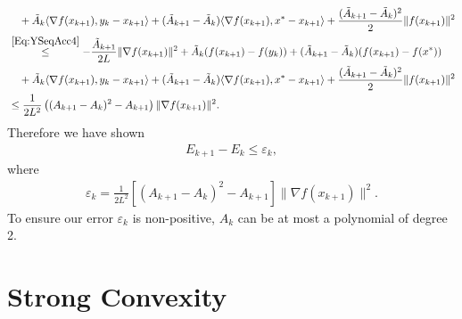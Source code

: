 \documentclass[11pt]{article}
\theoremstyle{plain}
\begin{document}
\begin{align*}
&\quad  + \tilde A_{k} \langle \nabla f(x_{k+1}),  y_k - x_{k+1}\rangle + (\tilde A_{k+1} - \tilde A_k)\langle \nabla f(x_{k+1}), x^\ast - x_{k+1}\rangle + \frac{(\tilde A_{k+1} - \tilde A_k)^2}{2}\|f(x_{k+1})\|^2 \\
& \overset{\eqref{Eq:YSeqAcc4}}{\leq} - \frac{\tilde A_{k+1}}{2L}\|\nabla f(x_{k+1})\|^2 + \tilde A_{k}(f(x_{k+1}) - f(y_{k})) + (\tilde A_{k+1} - \tilde A_k)(f(x_{k+1}) - f(x^\ast)) \\
&\quad  + \tilde A_{k} \langle \nabla f(x_{k+1}),  y_k - x_{k+1}\rangle + (\tilde A_{k+1} - \tilde A_k)\langle \nabla f(x_{k+1}), x^\ast - x_{k+1}\rangle + \frac{(\tilde A_{k+1} - \tilde A_k)^2}{2}\|f(x_{k+1})\|^2 \\
& \leq \frac{1}{2L^2}\left((A_{k+1} -  A_k)^2 - A_{k+1} \right) \|\nabla f(x_{k+1})\|^2.
\end{align*}
Therefore we have shown 
\begin{align*}
E_{k+1} - E_k \leq \varepsilon_k, 
\end{align*}
where 
\begin{align*}
\varepsilon_k = \frac{1}{2L^2}\left[(A_{k+1} -  A_k)^2 - A_{k+1} \right] \|\nabla f(x_{k+1})\|^2.
\end{align*}
To ensure our error $\varepsilon_k$ is non-positive, $A_k$ can be at most a polynomial of degree 2. %

\section{Strong Convexity}
\label{App:StrongConvexity}
\end{document}
